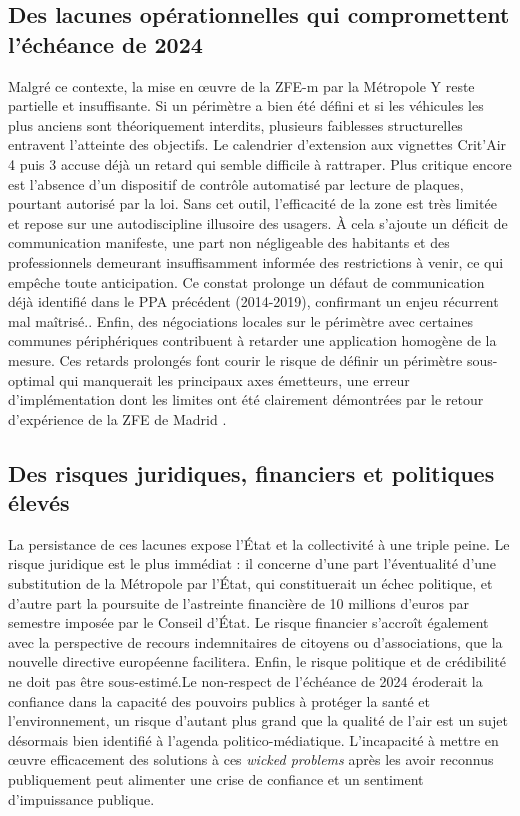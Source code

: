 \documentclass[12pt,a4paper]{article}
\begin{document}
\subsection{Des lacunes opérationnelles qui compromettent l'échéance de 2024}

Malgré ce contexte, la mise en œuvre de la ZFE-m par la Métropole Y reste partielle et insuffisante. Si un périmètre a bien été défini et si les véhicules les plus anciens sont théoriquement interdits, plusieurs faiblesses structurelles entravent l'atteinte des objectifs. Le calendrier d'extension aux vignettes Crit'Air 4 puis 3 accuse déjà un retard qui semble difficile à rattraper. Plus critique encore est l'absence d'un dispositif de contrôle automatisé par lecture de plaques, pourtant autorisé par la loi. Sans cet outil, l'efficacité de la zone est très limitée et repose sur une autodiscipline illusoire des usagers. À cela s'ajoute un déficit de communication manifeste, une part non négligeable des habitants et des professionnels demeurant insuffisamment informée des restrictions à venir, ce qui empêche toute anticipation. Ce constat prolonge un défaut de communication déjà identifié dans le PPA précédent (2014-2019), confirmant un enjeu récurrent mal maîtrisé.. Enfin, des négociations locales sur le périmètre avec certaines communes périphériques contribuent à retarder une application homogène de la mesure. Ces retards prolongés font courir le risque de définir un périmètre sous-optimal qui manquerait les principaux axes émetteurs, une erreur d'implémentation dont les limites ont été clairement démontrées par le retour d'expérience de la ZFE de Madrid \parencite{morillasImpactImplementationMadrids2024}.

\subsection{Des risques juridiques, financiers et politiques élevés}

La persistance de ces lacunes expose l'État et la collectivité à une triple peine. Le risque juridique est le plus immédiat : il concerne d'une part l'éventualité d'une substitution de la Métropole par l'État, qui constituerait un échec politique, et d'autre part la poursuite de l'astreinte financière de 10 millions d'euros par semestre imposée par le Conseil d'État. Le risque financier s'accroît également avec la perspective de recours indemnitaires de citoyens ou d'associations, que la nouvelle directive européenne facilitera. Enfin, le risque politique et de crédibilité ne doit pas être sous-estimé.Le non-respect de l'échéance de 2024 éroderait la confiance dans la capacité des pouvoirs publics à protéger la santé et l'environnement, un risque d'autant plus grand que la qualité de l'air est un sujet désormais bien identifié à l'agenda politico-médiatique. L'incapacité à mettre en œuvre efficacement des solutions à ces \textit{wicked problems} \parencite{headWickedProblemsPublic2022} après les avoir reconnus publiquement peut alimenter une crise de confiance et un sentiment d'impuissance publique.
\end{document}
